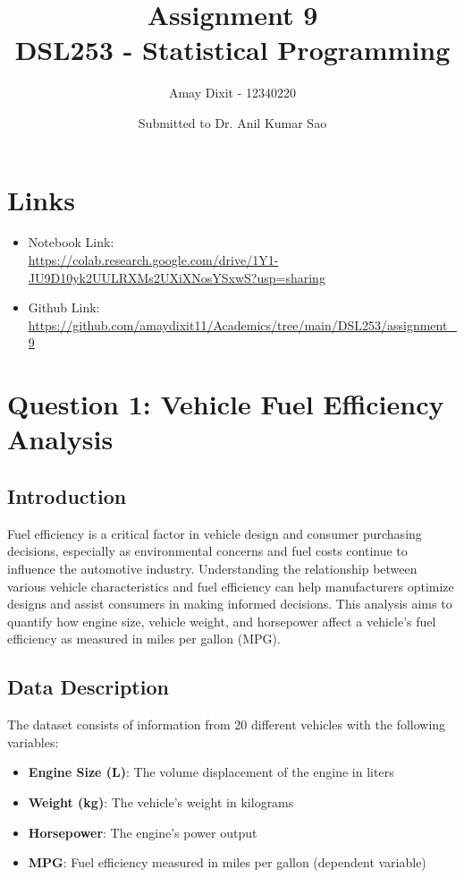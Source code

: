 \documentclass[12pt]{article}
\title{Assignment 9 \\ DSL253 - Statistical Programming}
\author{Amay Dixit - 12340220}
\date{Submitted to Dr. Anil Kumar Sao}
\begin{document}
\maketitle

\section*{Links}
\begin{sloppypar}
\begin{itemize}
    \item Notebook Link: \\ \url{https://colab.research.google.com/drive/1Y1-JU9D10yk2UULRXMs2UXiXNosYSxwS?usp=sharing}
    \item Github Link: \\ \url{https://github.com/amaydixit11/Academics/tree/main/DSL253/assignment_9}
\end{itemize}
\end{sloppypar}

\section{Question 1: Vehicle Fuel Efficiency Analysis}

\subsection{Introduction}
Fuel efficiency is a critical factor in vehicle design and consumer purchasing decisions, especially as environmental concerns and fuel costs continue to influence the automotive industry. Understanding the relationship between various vehicle characteristics and fuel efficiency can help manufacturers optimize designs and assist consumers in making informed decisions. This analysis aims to quantify how engine size, vehicle weight, and horsepower affect a vehicle's fuel efficiency as measured in miles per gallon (MPG).

\subsection{Data Description}
The dataset consists of information from 20 different vehicles with the following variables:
\begin{itemize}
    \item \textbf{Engine Size (L)}: The volume displacement of the engine in liters
    \item \textbf{Weight (kg)}: The vehicle's weight in kilograms
    \item \textbf{Horsepower}: The engine's power output
    \item \textbf{MPG}: Fuel efficiency measured in miles per gallon (dependent variable)
\end{itemize}
\end{document}
